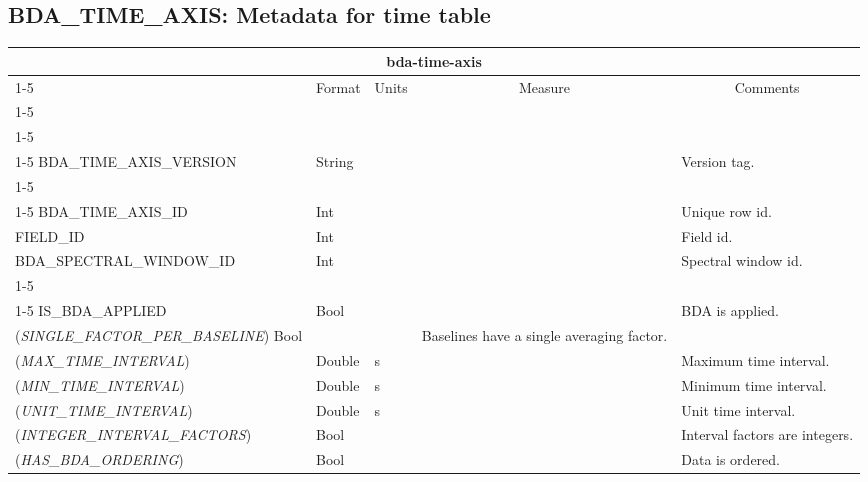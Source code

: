 \documentclass{article}
\newcommand{\defline}[1]{\cline{1-5}
\multicolumn{5}{|l|}{#1} \\
\cline{1-5}}
\newcommand{\definetable}[3][]
{
  \vfill\newpage
  \subsection{#2}
  \label{tbl:#1}
  \vspace{0.15in}
  \small
  \begin{tabular}{|l|p{1.25in}|l|p{.9in}|p{1.4in}|}
  \hline
  \multicolumn{5}{|c|}{\bf #1}\\
  \cline{1-5}
  \multicolumn{1}{|c|}{Name}&\multicolumn{1}{|c|}{Format}&
  \multicolumn{1}{|c|}{Units}&\multicolumn{1}{|c|}{Measure}&
  \multicolumn{1}{|c|}{Comments}\\
  \cline{1-5}
  #3
  \hline
  \end{tabular}
}
\begin{document}
\definetable[bda-time-axis]{BDA\_TIME\_AXIS: Metadata for time table}{
\defline{\bf Columns}
\defline{\em Keywords}
BDA\_TIME\_AXIS\_VERSION & String & & & Version tag.\\
\defline{\em Key}
BDA\_TIME\_AXIS\_ID & Int & & & Unique row id.\\
FIELD\_ID & Int & & & Field id.\\
BDA\_SPECTRAL\_WINDOW\_ID & Int & & & Spectral window id.\\
\defline{\em Data}
IS\_BDA\_APPLIED & Bool & & & BDA is applied.\\
({\it SINGLE\_FACTOR\_PER\_BASELINE}) Bool & & &
Baselines have a single averaging factor.\\
({\it MAX\_TIME\_INTERVAL}) & Double & s & & Maximum time interval.\\
({\it MIN\_TIME\_INTERVAL}) & Double & s & & Minimum time interval.\\
({\it UNIT\_TIME\_INTERVAL}) & Double & s & & Unit time interval.\\
({\it INTEGER\_INTERVAL\_FACTORS}) & Bool & & & Interval factors are integers.\\
({\it HAS\_BDA\_ORDERING}) & Bool & & & Data is ordered.\\
}
\end{document}
